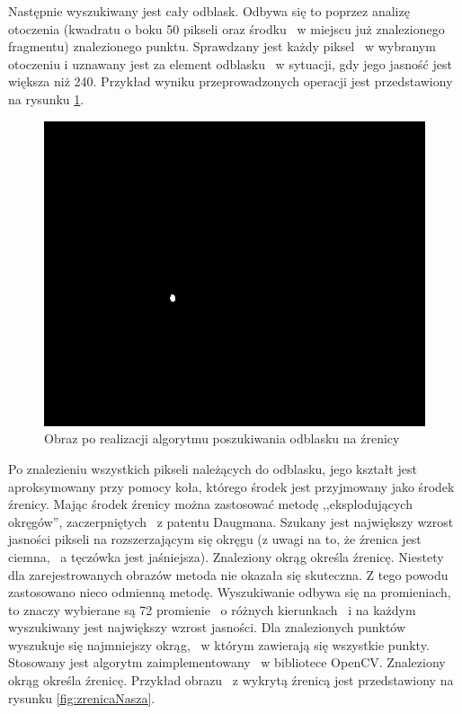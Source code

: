 Następnie wyszukiwany jest cały odblask. Odbywa się to poprzez analizę otoczenia (kwadratu o boku 50 pikseli oraz środku ~w miejscu już znalezionego fragmentu) znalezionego punktu. Sprawdzany jest każdy piksel ~w wybranym otoczeniu i uznawany jest za element odblasku ~w sytuacji, gdy jego jasność jest większa niż 240. Przykład wyniku przeprowadzonych operacji jest przedstawiony na rysunku \ref{fig:dobryOdblask}.

\begin{figure}
\begin{center}
\includegraphics[scale=0.5]{odblask.jpg}
\caption{Obraz po realizacji algorytmu poszukiwania odblasku na źrenicy}
\label{fig:dobryOdblask}
\end{center}
\end{figure}

Po znalezieniu wszystkich pikseli należących do odblasku, jego kształt jest aproksymowany przy pomocy koła, którego środek jest przyjmowany jako środek źrenicy. Mając środek źrenicy można zastosować metodę ,,eksplodujących okręgów'', zaczerpniętych ~z patentu Daugmana.  Szukany jest największy wzrost jasności pikseli na rozszerzającym się okręgu (z uwagi na to, że źrenica jest ciemna, ~a tęczówka jest jaśniejsza). Znaleziony okrąg określa źrenicę. Niestety dla zarejestrowanych obrazów metoda nie okazała się skuteczna. Z tego powodu zastosowano nieco odmienną metodę. Wyszukiwanie odbywa się na promieniach, to znaczy wybierane są 72 promienie ~o różnych kierunkach ~i na każdym wyszukiwany jest największy wzrost jasności. Dla znalezionych punktów wyszukuje się najmniejszy okrąg, ~w którym zawierają się wszystkie punkty. Stosowany jest algorytm zaimplementowany ~w bibliotece OpenCV. Znaleziony okrąg określa źrenicę. Przykład obrazu ~z wykrytą źrenicą jest przedstawiony na rysunku \ref{fig:zrenicaNasza}.

